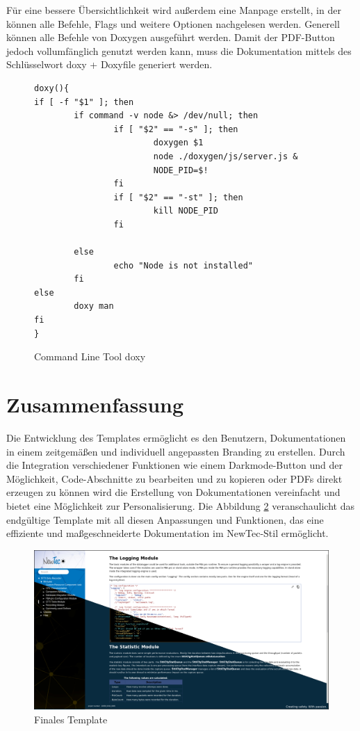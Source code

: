\documentclass[11pt,a4paper]{report}
\begin{document}
\noindent
Für eine bessere Übersichtlichkeit wird außerdem eine Manpage erstellt, in der können alle Befehle, Flags und weitere Optionen nachgelesen werden. Generell können alle Befehle von Doxygen ausgeführt werden. Damit der PDF-Button jedoch vollumfänglich genutzt werden kann, muss die Dokumentation mittels des Schlüsselwort \glqq doxy + Doxyfile \grqq{} generiert werden.

\begin{figure}[H]
    \begin{verbatim}
doxy(){
if [ -f "$1" ]; then
        if command -v node &> /dev/null; then
                if [ "$2" == "-s" ]; then
                        doxygen $1
                        node ./doxygen/js/server.js &
                        NODE_PID=$!
                fi
                if [ "$2" == "-st" ]; then
                        kill NODE_PID
                fi

        else
                echo "Node is not installed"
        fi
else
        doxy man
fi
}
    \end{verbatim}
    \centering
    \caption{Command Line Tool \glqq doxy \grqq{}}
    \label{code:doxy_command_line}
\end{figure}

\section{Zusammenfassung}

Die Entwicklung des Templates ermöglicht es den Benutzern, Dokumentationen in einem zeitgemäßen und individuell angepassten Branding zu erstellen. Durch die Integration verschiedener Funktionen wie einem Darkmode-Button und der Möglichkeit, Code-Abschnitte zu bearbeiten und zu kopieren oder PDFs direkt erzeugen zu können wird die Erstellung von Dokumentationen vereinfacht und bietet eine Möglichkeit zur Personalisierung. Die Abbildung \ref{fig:Template_Final} veranschaulicht das endgültige Template mit all diesen Anpassungen und Funktionen, das eine effiziente und maßgeschneiderte Dokumentation im NewTec-Stil ermöglicht.

\begin{figure}[H]
    \centering
    \includegraphics[width = 1.1\linewidth]{images/Finale_Doku.png}
    \caption{Finales Template}
    \label{fig:Template_Final}
\end{figure}
\end{document}
